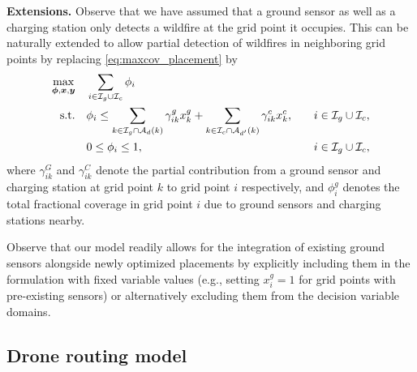 \documentclass{article}
\newcommand{\set}[1]{\mathcal{#1}}
\newcommand{\danique}[1]{\textcolor{blue}{#1}}
\begin{document}
\textbf{Extensions.}
Observe that we have assumed that a ground sensor as well as a charging station only detects a wildfire at the grid point it occupies. This can be naturally extended to allow partial detection of wildfires in neighboring grid points by replacing \eqref{eq:maxcov_placement} by 
\begin{align*}
    \displaystyle \max_{\bm \phi, \bm x, \bm y} &\quad \displaystyle \sum_{i \in \set I_g \cup \set I_c} \phi_i \\
    {\rm s.t. } 
    &\quad \displaystyle \phi_i \leq \sum_{k \in \set I_g \cap \set A_d(k)} \gamma_{ik}^g x_k^g + \sum_{k \in \set I_c \cap \set A_{d'}(k)} \gamma_{ik}^c x_k^c, &\quad i \in \set I_g \cup \set I_c,\\
    &\quad \displaystyle 0 \leq \phi_i \leq 1, &\quad i \in \set I_g \cup \set I_c,
\end{align*}
where $\gamma_{ik}^G$ and $\gamma_{ik}^C$ denote the partial contribution from a ground sensor and charging station at grid point $k$ to grid point $i$ respectively, and $\phi_i^g$ denotes the total fractional coverage in grid point $i$ due to ground sensors and charging stations nearby.


Observe that our model readily allows for the integration of existing ground sensors alongside newly optimized placements by explicitly including them in the formulation with fixed variable values (e.g., setting $x_i^g = 1$ for grid points with pre-existing sensors) or alternatively excluding them from the decision variable domains.


\subsection{Drone routing model}
\end{document}
